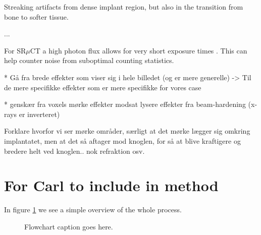 Streaking artifacts from dense implant region, but also in the transition from bone to softer tissue.

...

For SR$\mu$CT a high photon flux allows for very short exposure times \citep{srexptime}.
This can help counter noise from suboptimal counting statistics\citep{srnoise}.


* Gå fra brede effekter som viser sig i hele billedet (og er mere generelle) -> Til de mere specifikke effekter som er mere specifikke for vores case

* genskær fra voxels
mørke effekter modsat lysere effekter fra beam-hardening (x-rays er inverteret)

Forklare hvorfor vi ser mørke områder, særligt at det mørke lægger sig omkring implantatet,
men at det så aftager mod knoglen, for så at blive kraftigere og bredere helt ved knoglen..
nok refraktion osv. 


\section{For Carl to include in method}

In figure \ref{fig:flowchart} we see a simple overview of the whole process.
  
\begin{figure}[!h]
\centering
{}
\caption{Flowchart caption goes here.}
\label{fig:flowchart}
\end{figure}
